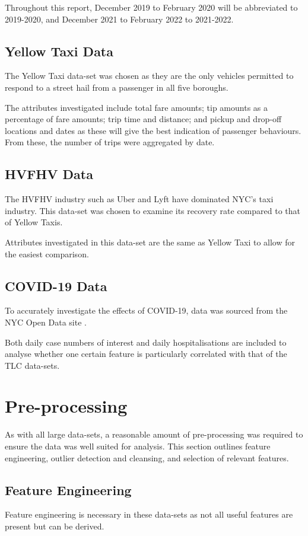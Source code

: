 \documentclass[11pt]{article}
\begin{document}
Throughout this report, December 2019 to February 2020 will be abbreviated to 2019-2020, and December 2021 to February 2022 to 2021-2022. 

\subsection{Yellow Taxi Data}
The Yellow Taxi data-set was chosen as they are the only vehicles permitted to respond to a street hail from a passenger in all five
boroughs.

The attributes investigated include total fare amounts; tip amounts as a percentage of fare amounts; trip time and distance; and pickup and drop-off locations and dates as these will give the best indication of passenger behaviours. From these, the number of trips were aggregated by date. 

\subsection{HVFHV Data}
The HVFHV industry such as Uber and Lyft have dominated NYC's taxi industry. This data-set was chosen to examine its recovery rate compared to that of Yellow Taxis. 

Attributes investigated in this data-set are the same as Yellow Taxi to allow for the easiest comparison.

\subsection{COVID-19 Data}
To accurately investigate the effects of COVID-19, data was sourced from the NYC Open Data site \cite{COVID_data}.

Both daily case numbers of interest and daily hospitalisations are included to analyse whether one certain feature is particularly correlated with that of the TLC data-sets. 

\section{Pre-processing}
As with all large data-sets, a reasonable amount of pre-processing was required to ensure the data was well suited for analysis. This section outlines feature engineering, outlier detection and cleansing, and selection of relevant features. 

\subsection{Feature Engineering}
Feature engineering is necessary in these data-sets as not all useful features are present but can be derived.
\end{document}
